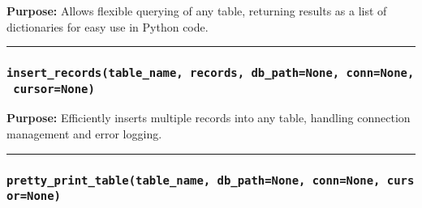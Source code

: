 \textbf{Purpose:} Allows flexible querying of any table, returning
results as a list of dictionaries for easy use in Python code.

\begin{center}\rule{0.5\linewidth}{0.5pt}\end{center}

\subsubsection{\texorpdfstring{\texttt{insert\_records(table\_name,\ records,\ db\_path=None,\ conn=None,\ cursor=None)}}{insert\_records(table\_name, records, db\_path=None, conn=None, cursor=None)}}\label{insert_recordstable_name-records-db_pathnone-connnone-cursornone}

\begin{Shaded}
\begin{Highlighting}[]
\OperatorTok{=}\OperatorTok{=}\OperatorTok{=}\NormalTok{):}
\end{Highlighting}
\end{Shaded}

\textbf{Purpose:} Efficiently inserts multiple records into any table,
handling connection management and error logging.

\begin{center}\rule{0.5\linewidth}{0.5pt}\end{center}

\subsubsection{\texorpdfstring{\texttt{pretty\_print\_table(table\_name,\ db\_path=None,\ conn=None,\ cursor=None)}}{pretty\_print\_table(table\_name, db\_path=None, conn=None, cursor=None)}}\label{pretty_print_tabletable_name-db_pathnone-connnone-cursornone}

